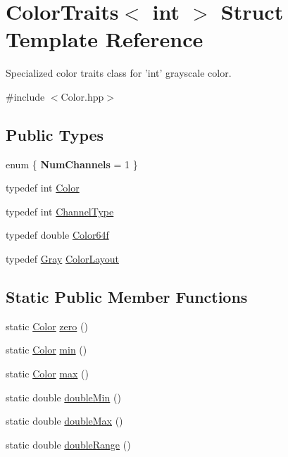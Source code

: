 \hypertarget{struct_d_o_1_1_color_traits_3_01int_01_4}{\section{Color\-Traits$<$ int $>$ Struct Template Reference}
\label{struct_d_o_1_1_color_traits_3_01int_01_4}
}


Specialized color traits class for 'int' grayscale color.  




{\ttfamily \#include $<$Color.\-hpp$>$}

\subsection*{Public Types}
\begin{DoxyCompactItemize}
\item 
enum \{ {\bfseries Num\-Channels} = 1
 \}
\item 
typedef int \hyperlink{struct_d_o_1_1_color_traits_3_01int_01_4_aeeff082dbf607675914ae4e2f81d6518}{Color}
\item 
typedef int \hyperlink{struct_d_o_1_1_color_traits_3_01int_01_4_a793f06113f28e96ed56101c7a76ac681}{Channel\-Type}
\item 
typedef double \hyperlink{struct_d_o_1_1_color_traits_3_01int_01_4_a9a301fd8ba0a7225e38351d3e5b2e4d3}{Color64f}
\item 
typedef \hyperlink{struct_d_o_1_1_gray}{Gray} \hyperlink{struct_d_o_1_1_color_traits_3_01int_01_4_a7c9d599cfa0d1404784fbe60e6bcfd24}{Color\-Layout}
\end{DoxyCompactItemize}
\subsection*{Static Public Member Functions}
\begin{DoxyCompactItemize}
\item 
static \hyperlink{struct_d_o_1_1_color_traits_3_01int_01_4_aeeff082dbf607675914ae4e2f81d6518}{Color} \hyperlink{struct_d_o_1_1_color_traits_3_01int_01_4_a57b00f8db42515f404e06ab933932125}{zero} ()
\item 
static \hyperlink{struct_d_o_1_1_color_traits_3_01int_01_4_aeeff082dbf607675914ae4e2f81d6518}{Color} \hyperlink{struct_d_o_1_1_color_traits_3_01int_01_4_a1cd81f912af766f8004e4d5a82a7128b}{min} ()
\item 
static \hyperlink{struct_d_o_1_1_color_traits_3_01int_01_4_aeeff082dbf607675914ae4e2f81d6518}{Color} \hyperlink{struct_d_o_1_1_color_traits_3_01int_01_4_aded391d5e231096e135e08760c0fbeb6}{max} ()
\item 
static double \hyperlink{struct_d_o_1_1_color_traits_3_01int_01_4_aa122aba748bfd453a27d2c30b368dbc3}{double\-Min} ()
\item 
static double \hyperlink{struct_d_o_1_1_color_traits_3_01int_01_4_ab9fb6b1bb12e23b725453a69f6193c30}{double\-Max} ()
\item 
static double \hyperlink{struct_d_o_1_1_color_traits_3_01int_01_4_aed64f95e634b8dac0ae5a0aed2b45740}{double\-Range} ()
\end{DoxyCompactItemize}


